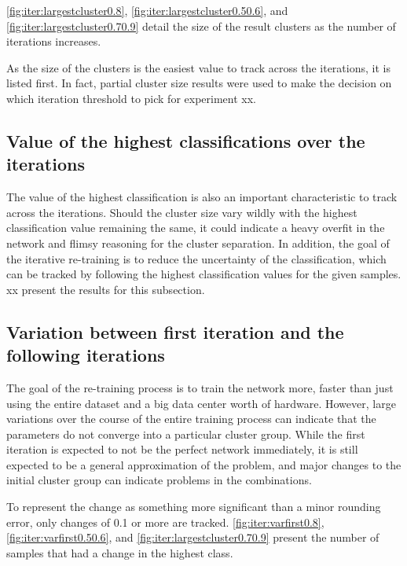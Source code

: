 \cref{fig:iter:largestcluster0.8}, \cref{fig:iter:largestcluster0.50.6}, and \cref{fig:iter:largestcluster0.70.9} detail the size of the result clusters as the number of iterations increases.

As the size of the clusters is the easiest value to track across the iterations, it is listed first.
In fact, partial cluster size results were used to make the decision on which iteration threshold to pick for experiment xx.

\subsection{Value of the highest classifications over the iterations}
The value of the highest classification is also an important characteristic to track across the iterations.
Should the cluster size vary wildly with the highest classification value remaining the same, it could indicate a heavy overfit in the network and flimsy reasoning for the cluster separation.
In addition, the goal of the iterative re-training is to reduce the uncertainty of the classification, which can be tracked by following the highest classification values for the given samples.
xx present the results for this subsection.


\subsection{Variation between first iteration and the following iterations}



The goal of the re-training process is to train the network more, faster than just using the entire dataset and a big data center worth of hardware.
However, large variations over the course of the entire training process can indicate that the parameters do not converge into a particular cluster group.
While the first iteration is expected to not be the perfect network immediately, it is still expected to be a general approximation of the problem, and major changes to the initial cluster group can indicate problems in the combinations.

To represent the change as something more significant than a minor rounding error, only changes of 0.1 or more are tracked.
\cref{fig:iter:varfirst0.8}, \cref{fig:iter:varfirst0.50.6}, and \cref{fig:iter:largestcluster0.70.9} present the number of samples that had a change in the highest class.


